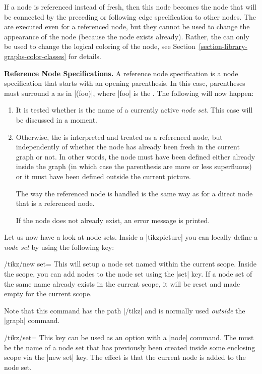 If a node is referenced instead of fresh, then this node becomes the
node that will be connected by the preceding or following edge
specification to other 
nodes. The  are executed even for a referenced node, but
they cannot be used to change the appearance of the node (because the
node exists already). Rather, the  can only be used to
change the logical coloring of the node, see
Section~\ref{section-library-graphs-color-classes} for details.

\medskip
\textbf{Reference Node Specifications.} A reference node specification
is a node specification that starts with an opening parenthesis. In
this case, parentheses must surround a  as in |(foo)|,
where |foo| is the . The following will now happen:

\begin{enumerate}
\item It is tested whether  is the name of a currently
  active \emph{node set}. This case will be discussed in a moment.
\item Otherwise, the  is interpreted and treated as a
  referenced node, but independently of whether the node has already
  been fresh in the current graph or not. In other words, the node
  must have been defined either already inside the graph (in which
  case the parenthesis are more or less superfluous) or it must have
  been defined outside the current picture.

  The way the referenced node is handled is the same way as for a
  direct node that is a referenced node.

  If the node does not already exist, an error message is printed.
\end{enumerate}

Let us now have a look at node sets. Inside a |{tikzpicture}| you can
locally define a \emph{node set} by using the following key:
\begin{key}{/tikz/new set=}
  This will setup a node set named  within the current
  scope. Inside the scope, you can add nodes to the node set using the
  |set| key. If a node set of the same name already exists in the
  current scope, it will be reset and made empty for the current
  scope.

  Note that this command has the path |/tikz| and is normally used
  \emph{outside} the |graph| command.
\end{key}
\begin{key}{/tikz/set=}
  This key can be used as an option with a |node| command. The
   must be the name of a node set that has previously
  been created inside some enclosing scope via the |new set| key. The
  effect is that the current node is added to the node set.
\end{key}

